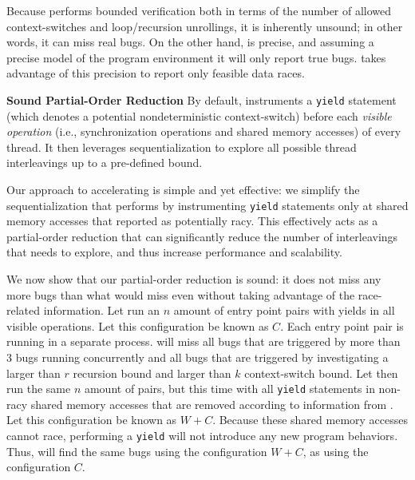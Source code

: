 Because \corral performs bounded verification both in terms of the number of allowed context-switches and loop/recursion unrollings, it is inherently unsound; in other words, it can miss real bugs. On the other hand, \corral is precise, and assuming a precise model of the program environment it will only report true bugs. \whoop takes advantage of this precision to report only feasible data races.

\noindent
\textbf{Sound Partial-Order Reduction}\xspace\xspace By default, \corral instruments a \texttt{yield} statement (which denotes a potential nondeterministic context-switch) before each \emph{visible operation} (i.e., synchronization operations and shared memory accesses) of every thread. It then leverages sequentialization to explore all possible thread interleavings up to a pre-defined bound.

Our approach to accelerating \corral is simple and yet effective: we simplify
the sequentialization that \corral performs by instrumenting \texttt{yield}
statements only at shared memory accesses that \whoop reported as potentially
racy. This effectively acts as a partial-order reduction that can significantly
reduce the number of interleavings that \corral needs to explore, and thus
increase performance and scalability.

We now show that our partial-order reduction is sound: it does not miss any more
bugs than what \corral would miss even without taking advantage of the \whoop
race-related information. Let \corral run an $n$ amount of entry point pairs
with yields in all visible operations. Let this configuration be known as $C$.
Each entry point pair is running in a separate \corral process. \corral will
miss all bugs that are triggered by more than 3 bugs running concurrently and
all bugs that are triggered by investigating a larger than $r$ recursion bound
and larger than $k$ context-switch bound. Let \corral then run the same $n$
amount of pairs, but this time with all \texttt{yield} statements in non-racy
shared memory accesses that are removed according to information from \whoop. Let this configuration be
known as $W+C$. Because these shared memory accesses cannot race, performing a
\texttt{yield} will not introduce any new program behaviors. Thus, \corral will
find the same bugs using the configuration $W+C$, as using the configuration
$C$.

